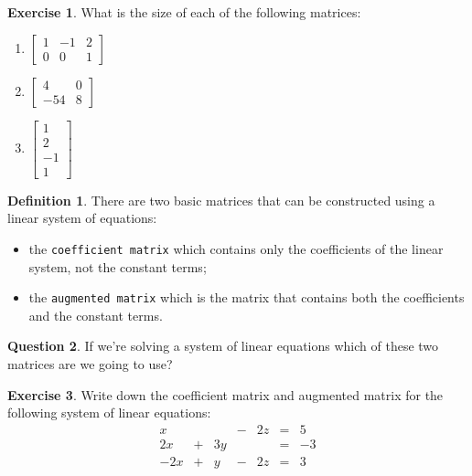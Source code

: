 \documentclass[handout]{beamer}
\theoremstyle{definition}
\newtheorem{exercise}{Exercise}
\newtheorem{question}[exercise]{Question}
\newtheorem*{defn}{Definition}
\renewcommand{\emph}[1]{{\color{blue}\texttt{#1}}}
\begin{document}
\begin{frame}{\insertframenumber}
	\begin{exercise}
	What is the size of each of the following matrices:
		\begin{enumerate}[label=(\alph*)]
			\item $\begin{bmatrix}
				1&-1&2\\0&0&1
			\end{bmatrix}$
			\item $\begin{bmatrix}
			4&0\\-54&8
			\end{bmatrix}$
			\item $\begin{bmatrix}
			1\\2\\-1\\1
			\end{bmatrix}$
		\end{enumerate}
	\end{exercise}
\end{frame}

\begin{frame}{\insertframenumber}
	\begin{defn}
		There are two basic matrices that can be constructed using a linear system of equations:
			\begin{itemize}
				\item the \emph{coefficient matrix} which contains only the coefficients of the linear system, not the constant terms;
				\item the \emph{augmented matrix} which is the matrix that contains both the coefficients and the constant terms.
			\end{itemize}
	\end{defn}
	\begin{question}
		If we're solving a system of linear equations which of these two matrices are we going to use?
	\end{question}
\end{frame}


\begin{frame}{\insertframenumber}
	\begin{exercise}
		Write down the coefficient matrix and augmented matrix for the following system of linear equations:
			\[
				\begin{array}{rcrcrccl}
					x&&&-&2z&=&5\\
					2x&+&3y&&&=&-3\\
					-2x&+&y&-&2z&=&3
				\end{array}
			\]
	\end{exercise}
\end{frame}
\end{document}
